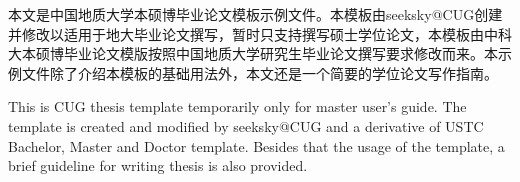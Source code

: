 ﻿\begin{cnabstract}
\begin{spacing}{1.0}
本文是中国地质大学本硕博毕业论文模板示例文件。本模板由seeksky@CUG创建并修改以适用于地大毕业论文撰写，暂时只支持撰写硕士学位论文，本模板由中科大本硕博毕业论文模版按照中国地质大学研究生毕业论文撰写要求修改而来。本示例文件除了介绍本模板的基础用法外，本文还是一个简要的学位论文写作指南。

\end{spacing}
\end{cnabstract}


\begin{enabstract}
\begin{spacing}{1.0}
This is CUG thesis template temporarily only for master user's guide. The template is created and modified by seeksky@CUG and a derivative of USTC Bachelor, Master and Doctor template. Besides that
the usage of the template, a brief
guideline for writing thesis is also provided.


\end{spacing}
\end{enabstract}
